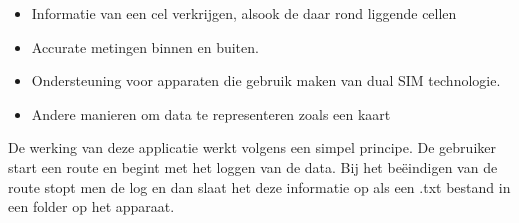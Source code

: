 \begin{itemize}
    \item Informatie van een cel verkrijgen, alsook de daar rond liggende cellen
    \item Accurate metingen binnen en buiten.
    \item Ondersteuning voor apparaten die gebruik maken van dual SIM technologie.
    \item Andere manieren om data te representeren zoals een kaart
\end{itemize}

De werking van deze applicatie werkt volgens een simpel principe. De gebruiker start een route en begint met het loggen van de data. Bij het beëindigen van de route stopt men de log en dan slaat het deze informatie op als een .txt bestand in een folder op het apparaat. 




